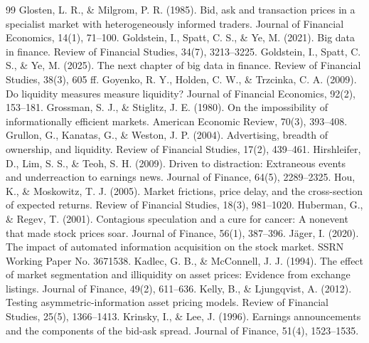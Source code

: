 \documentclass[a4paper,11pt]{ctexart}
\begin{document}
\begin{thebibliography}{99}
 Glosten, L. R., \& Milgrom, P. R. (1985). Bid, ask and transaction prices in a specialist market with heterogeneously informed traders. Journal of Financial Economics, 14(1), 71–100.
 Goldstein, I., Spatt, C. S., \& Ye, M. (2021). Big data in finance. Review of Financial Studies, 34(7), 3213–3225.
 Goldstein, I., Spatt, C. S., \& Ye, M. (2025). The next chapter of big data in finance. Review of Financial Studies, 38(3), 605 ff.
 Goyenko, R. Y., Holden, C. W., \& Trzcinka, C. A. (2009). Do liquidity measures measure liquidity? Journal of Financial Economics, 92(2), 153–181.
 Grossman, S. J., \& Stiglitz, J. E. (1980). On the impossibility of informationally efficient markets. American Economic Review, 70(3), 393–408.
 Grullon, G., Kanatas, G., \& Weston, J. P. (2004). Advertising, breadth of ownership, and liquidity. Review of Financial Studies, 17(2), 439–461.
 Hirshleifer, D., Lim, S. S., \& Teoh, S. H. (2009). Driven to distraction: Extraneous events and underreaction to earnings news. Journal of Finance, 64(5), 2289–2325.
 Hou, K., \& Moskowitz, T. J. (2005). Market frictions, price delay, and the cross-section of expected returns. Review of Financial Studies, 18(3), 981–1020.
 Huberman, G., \& Regev, T. (2001). Contagious speculation and a cure for cancer: A nonevent that made stock prices soar. Journal of Finance, 56(1), 387–396.
 Jäger, I. (2020). The impact of automated information acquisition on the stock market. SSRN Working Paper No. 3671538.
 Kadlec, G. B., \& McConnell, J. J. (1994). The effect of market segmentation and illiquidity on asset prices: Evidence from exchange listings. Journal of Finance, 49(2), 611–636.
 Kelly, B., \& Ljungqvist, A. (2012). Testing asymmetric-information asset pricing models. Review of Financial Studies, 25(5), 1366–1413.
 Krinsky, I., \& Lee, J. (1996). Earnings announcements and the components of the bid-ask spread. Journal of Finance, 51(4), 1523–1535.

\end{thebibliography}
\end{document}
